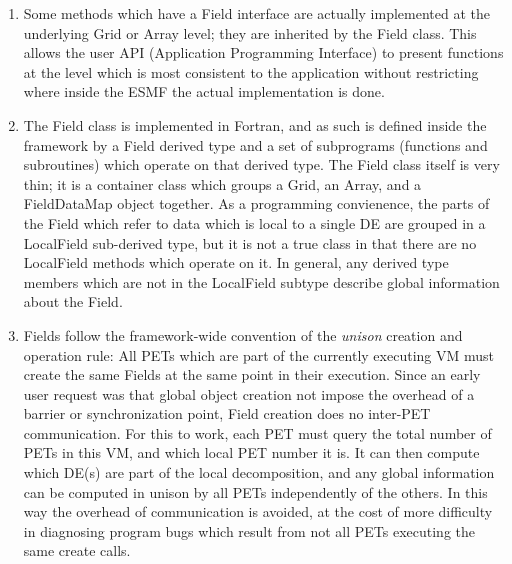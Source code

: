 

\begin{enumerate}

\item Some methods which have a Field interface are actually 
implemented at the underlying Grid or Array level; they
are inherited by the Field class.  This allows the user
API (Application Programming Interface) to present functions at
the level which is most consistent to the application without
restricting where inside the ESMF the actual implementation
is done.

\item The Field class is implemented in Fortran, and as such is
defined inside the framework by a Field derived type and a set of 
subprograms (functions and subroutines) which operate on that derived type.  
The Field class itself is very thin; it is a container class which
groups a Grid, an Array, and a FieldDataMap object together.
As a programming convienence, the parts of the Field which refer to 
data which is local to a single DE are grouped in a LocalField 
sub-derived type,
but it is not a true class in that there are no LocalField methods
which operate on it.   In general, any derived type members which
are not in the LocalField subtype describe global information about
the Field.

\item Fields follow the framework-wide convention of the
{\it unison} creation and operation rule: All PETs which are
part of the currently executing VM must create the
same Fields at the same point in their execution.  Since an early
user request was that global object creation not impose the overhead of
a barrier or synchronization point, Field creation does no inter-PET
communication.  For this to work, each PET must query the total number
of PETs in this VM, and which local PET number it is.  It can then
compute which DE(s) are part of the local decomposition, and any
global information can be computed in unison by all PETs independently
of the others.  In this way the overhead of communication is avoided,
at the cost of more difficulty in diagnosing program bugs which result
from not all PETs executing the same create calls.


\end{enumerate}
